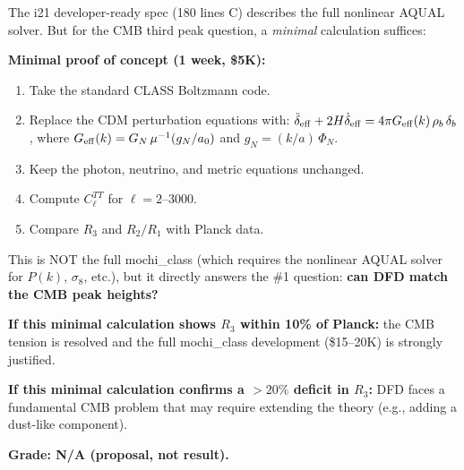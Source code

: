 \documentclass[11pt]{article}
\newcommand{\aM}{a_0}
\begin{document}
\begin{tcolorbox}[colback=blue!5!white, colframe=blue!70!black,
  title=\textbf{W4i22 TOP 5 FINDINGS --- COSMOLOGY TEAM}]
\begin{enumerate}
  The i21 developer-ready spec (180 lines C) describes the full nonlinear
  AQUAL solver.  But for the CMB third peak question, a \emph{minimal}
  calculation suffices:

  \textbf{Minimal proof of concept (1 week, \$5K):}
  \begin{enumerate}
  \item Take the standard CLASS Boltzmann code.
  \item Replace the CDM perturbation equations with:
    $\ddot\delta_{\rm eff} + 2H\dot\delta_{\rm eff}
    = 4\pi G_{\rm eff}(k)\,\rho_b\,\delta_b$, where
    $G_{\rm eff}(k) = G_N\,\mu^{-1}(g_N/\aM)$ and
    $g_N = (k/a)\,\Phi_N$.
  \item Keep the photon, neutrino, and metric equations unchanged.
  \item Compute $C_\ell^{TT}$ for $\ell = 2$--$3000$.
  \item Compare $R_3$ and $R_2/R_1$ with Planck data.
  \end{enumerate}

  This is NOT the full mochi\_class (which requires the nonlinear AQUAL
  solver for $P(k)$, $\sigma_8$, etc.), but it directly answers the
  \#1 question: \textbf{can DFD match the CMB peak heights?}

  \textbf{If this minimal calculation shows $R_3$ within 10\% of Planck:}
  the CMB tension is resolved and the full mochi\_class development
  (\$15--20K) is strongly justified.

  \textbf{If this minimal calculation confirms a $>20\%$ deficit in $R_3$:}
  DFD faces a fundamental CMB problem that may require extending the theory
  (e.g., adding a dust-like component).

  \textbf{Grade: N/A (proposal, not result).}

\end{enumerate}
\end{tcolorbox}
\end{document}

